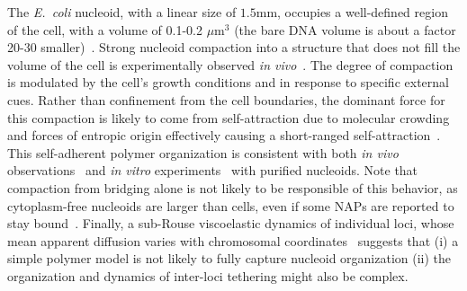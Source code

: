 \documentclass[
preprint,
a4paper,
12pt,
superscriptaddress,
pre]{revtex4}
\begin{document}
The \emph{E.~coli} nucleoid, with a linear size of $1.5$mm, occupies a
well-defined region of the cell, with a volume of 0.1-0.2
$\mu$m$^3$ (the bare DNA volume is about a factor 20-30
smaller)~\cite{Stavans2006}.  Strong nucleoid compaction into a
structure that does not fill the volume of the cell is experimentally
observed \emph{in vivo}~\cite{Zim06b-a,HadizadehYazdi2012}. %
The degree of compaction is modulated by the cell's growth conditions and
in response to specific external cues.  Rather than confinement from
the cell boundaries, the dominant force for this compaction is likely
to come from self-attraction due to molecular crowding and forces of
entropic origin effectively causing a short-ranged
self-attraction~\cite{Odi98,Vries2010}. This self-adherent polymer
organization is consistent with both \emph{in vivo}
observations~\cite{HadizadehYazdi2012,Fisher2013} and \emph{in vitro}
experiments~\cite{Pelletier2012} with purified nucleoids.
%
Note that compaction from bridging alone is not likely to be
responsible of this behavior, as cytoplasm-free nucleoids are larger
than cells, even if some NAPs are reported to stay
bound~\cite{Pelletier2012,Wegner2012,Thacker2013}.
%
Finally, a sub-Rouse viscoelastic dynamics of individual loci, whose
mean apparent diffusion varies with chromosomal
coordinates~\cite{Javer2013,Weber2010} suggests that (i) a simple
polymer model is not likely to fully capture nucleoid organization
(ii) the organization and dynamics of inter-loci tethering might also
be complex.
\end{document}
